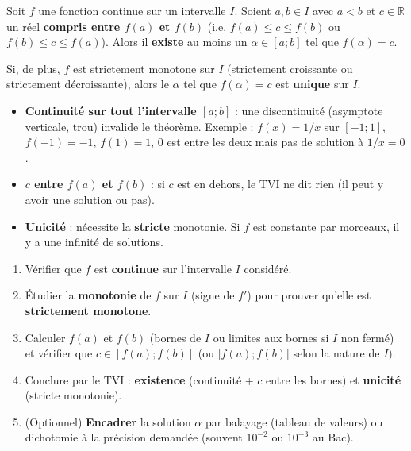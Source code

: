\documentclass[11pt]{article}
\newcommand{\cle}[1]{{\popxbold\color{popdark}#1}}
\begin{document}
\begin{propriete}
\label{th:tvi_existence}
Soit $f$ une fonction \cle{continue} sur un intervalle $I$. Soient $a,b \in I$ avec $a < b$ et $c \in \mathbb{R}$ un réel \textbf{compris entre $f(a)$ et $f(b)$} (i.e. $f(a) \le c \le f(b)$ ou $f(b) \le c \le f(a)$).
Alors il \textbf{existe} au moins un $\alpha \in [a;b]$ tel que $f(\alpha) = c$.
\end{propriete}

\begin{propriete}
\label{th:tvi_unicite}
Si, de plus, $f$ est \cle{strictement monotone} sur $I$ (strictement croissante ou strictement décroissante), alors le $\alpha$ tel que $f(\alpha)=c$ est \textbf{unique} sur $I$.
\end{propriete}

\begin{attention}
\begin{itemize}
  \item \textbf{Continuité sur tout l'intervalle $[a;b]$} : une discontinuité (asymptote verticale, trou) invalide le théorème. Exemple : $f(x)=1/x$ sur $[-1;1]$, $f(-1)=-1$, $f(1)=1$, $0$ est entre les deux mais pas de solution à $1/x=0$.
  \item \textbf{$c$ entre $f(a)$ et $f(b)$} : si $c$ est en dehors, le TVI ne dit rien (il peut y avoir une solution ou pas).
  \item \textbf{Unicité} : nécessite la \textbf{stricte} monotonie. Si $f$ est constante par morceaux, il y a une infinité de solutions.
\end{itemize}
\end{attention}

\begin{methode}[Prouver qu'une équation $f(x)=c$ admet une unique solution sur un intervalle]
\begin{enumerate}
  \item Vérifier que $f$ est \textbf{continue} sur l'intervalle $I$ considéré.
  \item Étudier la \textbf{monotonie} de $f$ sur $I$ (signe de $f'$) pour prouver qu'elle est \textbf{strictement monotone}.
  \item Calculer $f(a)$ et $f(b)$ (bornes de $I$ ou limites aux bornes si $I$ non fermé) et vérifier que $c \in [f(a); f(b)]$ (ou $]f(a); f(b)[$ selon la nature de $I$).
  \item Conclure par le TVI : \textbf{existence} (continuité + $c$ entre les bornes) et \textbf{unicité} (stricte monotonie).
  \item (Optionnel) \textbf{Encadrer} la solution $\alpha$ par balayage (tableau de valeurs) ou dichotomie à la précision demandée (souvent $10^{-2}$ ou $10^{-3}$ au Bac).
\end{enumerate}
\end{methode}
\end{document}
